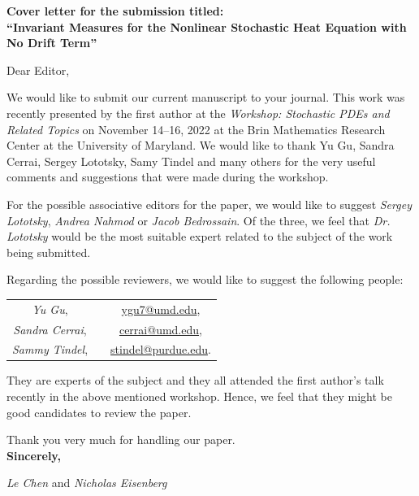 \documentclass[11pt,a4paper,roman]{moderncv}
\begin{document}
\vspace{1em}

\vspace{1em}
\date{\today}
\opening{\textbf{Cover letter for the submission titled:\\
``Invariant Measures for the Nonlinear Stochastic Heat Equation with No Drift Term''}}

\makelettertitle

Dear Editor,\\


\vspace{1em}

We would like to submit our current manuscript to your journal. This work was recently presented by the first author at
the \textit{Workshop: Stochastic PDEs and Related Topics} on November 14--16, 2022 at the Brin Mathematics Research
Center at the University of Maryland. We would like to thank Yu Gu, Sandra Cerrai, Sergey Lototsky, Samy Tindel and
many others for the very useful comments and suggestions that were made during the workshop.\\

\vspace{1em}

For the possible associative editors for the paper, we would like to suggest \textit{Sergey Lototsky}, \textit{Andrea
Nahmod} or \textit{Jacob Bedrossain}. Of the three, we feel that \textit{Dr. Lototsky} would be the most suitable expert
related to the subject of the work being submitted.\\ \vspace{1em}

Regarding the possible reviewers, we would like to suggest the following people:
\begin{center}
  \renewcommand{\arraystretch}{1.2}
  \begin{tabular}{c c c}
   \textit{Yu Gu},         & \phantom{aaa} & \url{ygu7@umd.edu},   \\
   \textit{Sandra Cerrai}, & \phantom{aaa} & \url{cerrai@umd.edu}, \\
   \textit{Sammy Tindel},  & \phantom{aaa} & \url{stindel@purdue.edu}.
  \end{tabular}
\end{center}
They are experts of the subject and they all attended the first author's talk recently in the above mentioned workshop.
Hence, we feel that they might be good candidates to review the paper.

\vspace{1em}

Thank you very much for handling our paper. \\

\vspace{0.5cm}
{\textbf{Sincerely,}} \\
\vspace{0.25cm}

\textit{Le Chen} and \textit{Nicholas Eisenberg}
\end{document}
